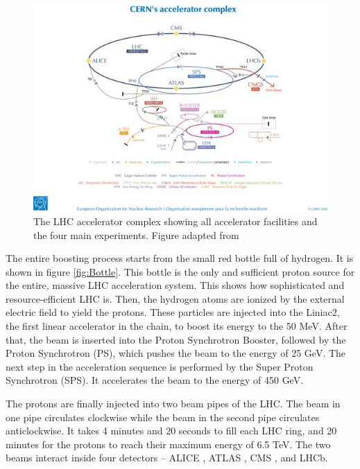 \begin{figure}
\centering
\includegraphics{figures/LHC.jpg}
\caption{The LHC accelerator complex showing all accelerator facilities and the four main experiments. Figure adapted from \cite{LHC_complex}
\label{fig:LHC}}
\end{figure}

The entire boosting process starts from the small red bottle full of hydrogen. It is shown in figure \ref{fig:Bottle}. This bottle is the only and sufficient proton source for the entire, massive LHC acceleration system. This shows how sophisticated and resource-efficient LHC is. Then, the hydrogen atoms are ionized by the external electric field to yield the protons. These particles are injected into the Liniac2, the first linear accelerator in the chain, to boost its energy to the 50 MeV. After that, the beam is inserted into the Proton Synchrotron Booster, followed by the Proton Synchrotron (PS), which pushes the beam to the energy of 25 GeV. The next step in the acceleration sequence is performed by the Super Proton Synchrotron (SPS). It accelerates the beam to the energy of 450 GeV.  

The protons are finally injected into two beam pipes of the LHC. The beam in one pipe circulates clockwise while the beam in the second pipe circulates anticlockwise. It takes 4 minutes and 20 seconds to fill each LHC ring, and 20 minutes for the protons to reach their maximum energy of 6.5 TeV. The two beams interact inside four detectors – ALICE \cite{Alice}, ATLAS \cite{Atlas}, CMS \cite{CMS}, and LHCb.

